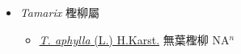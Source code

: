 
  \begin{itemize}
 \item[] \textit{Tamarix} 檉柳屬
                    
  \begin{itemize}
        \item[] \href{http://www.theplantlist.org/tpl1.1/search?q=Tamarix+aphylla}{\textit{T. aphylla} (L.) H.Karst.}   無葉檉柳 NA$^n$
  \end{itemize}
  \end{itemize}
